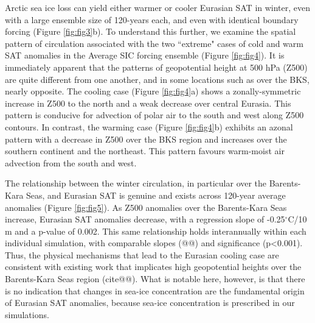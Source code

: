 \documentclass{nature}
\begin{document}
Arctic sea ice loss can yield either warmer or cooler Eurasian SAT in winter, even with a large ensemble size of 120-years each, and even with identical boundary forcing (Figure \ref{fig:fig3}b). To understand this further, we examine the spatial pattern of circulation associated with the two ``extreme" cases of cold and warm SAT anomalies in the Average SIC forcing ensemble (Figure \ref{fig:fig4}). It is immediately apparent that the patterns of geopotential height at 500 hPa (Z500) are quite different from one another, and in some locations such as over the BKS, nearly opposite. The cooling case (Figure \ref{fig:fig4}a) shows a zonally-symmetric increase in Z500 to the north and a weak decrease over central Eurasia. This pattern is conducive for advection of polar air to the south and west along Z500 contours. In contrast, the warming case (Figure \ref{fig:fig4}b) exhibits an azonal pattern with a decrease in Z500 over the BKS region and increases over the southern continent and the northeast. This pattern favours warm-moist air advection from the south and west.

The relationship between the winter circulation, in particular over the Barents-Kara Seas, and Eurasian SAT is genuine and exists across 120-year average anomalies (Figure \ref{fig:fig5}). As Z500 anomalies over the Barents-Kara Seas increase, Eurasian SAT anomalies decrease, with a regression slope of -0.25$^\circ$C/10 m and a p-value of 0.002. This same relationship holds interannually within each individual simulation, with comparable slopes (@@) and significance (p<0.001). Thus, the physical mechanisms that lead to the Eurasian cooling case are consistent with existing work that implicates high geopotential heights over the Barents-Kara Seas region (cite@@). What is notable here, however, is that there is no indication that changes in sea-ice concentration are the fundamental origin of Eurasian SAT anomalies, because sea-ice concentration is prescribed in our simulations. 

\end{document}
